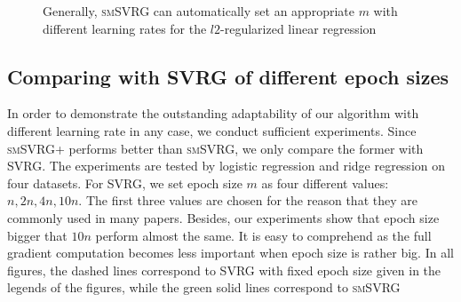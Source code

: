 \documentclass[conference]{IEEEtran}
\begin{document}
\begin{figure}[t]
\label{figure_linear}
\caption{Generally, \textsc{smSVRG} can automatically set an appropriate $m$ with different learning rates for the $l2$-regularized linear regression}
\end{figure}


 \subsection{Comparing with SVRG of different epoch sizes}
 In order to demonstrate the outstanding adaptability of our algorithm with different learning rate in any case, we conduct sufficient experiments. Since \textsc{smSVRG+} performs better than \textsc{smSVRG}, we only compare the former with SVRG. The experiments are tested by logistic regression and ridge regression on four datasets.
 For SVRG, we set epoch size $m$ as four different values: $n, 2n, 4n, 10n$. The first three values are chosen for the reason that they are commonly used in many papers. Besides, our experiments show that epoch size bigger that $10n$ perform almost the same. It is easy to comprehend as the full gradient computation becomes less important when epoch size is rather big. In all figures, the dashed lines correspond to SVRG with fixed epoch size given in the legends of the figures, while the green solid lines correspond to \textsc{smSVRG}
 
\end{document}
